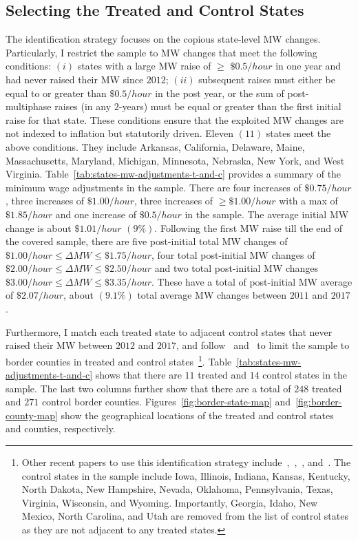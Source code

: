 \documentclass[12pt, english]{article}
\begin{document}
    \subsection{Selecting the Treated and Control States}\label{subsec:selecting-the-treated-and-control-states}
    The identification strategy focuses on the copious state-level MW changes. Particularly, I restrict the sample to MW changes that meet the following conditions: $(i)$ states with a large MW raise of $\geq$ $\$0.5/hour$ in one year and had never raised their MW since $2012$; $(ii)$ subsequent raises must either be equal to or greater than $\$0.5/hour$ in the post year, or the sum of post-multiphase raises (in any $2$-years) must be equal or greater than the first initial raise for that state. These conditions ensure that the exploited MW changes are not indexed to inflation but statutorily driven. Eleven $(11)$ states meet the above conditions. They include Arkansas, California, Delaware, Maine, Massachusetts, Maryland, Michigan, Minnesota, Nebraska, New York, and West Virginia. Table~\ref{tab:states-mw-adjustments-t-and-c} provides a summary of the minimum wage adjustments in the sample. There are four increases of $\$0.75/hour$, three increases of $\$1.00/hour$, three increases of $\geq \$1.00/hour$ with a max of $\$1.85/hour$ and one increase of $\$0.5/hour$ in the sample. The average initial MW change is about $\$1.01/hour$ $(9\%)$. Following the first MW raise till the end of the covered sample, there are five post-initial total MW changes of $\$1.00/hour \leq \Delta MW \leq \$1.75/hour$, four total post-initial MW changes of $\$2.00/hour \leq \Delta MW \leq \$2.50/hour$ and two total post-initial MW changes $\$3.00/hour \leq \Delta MW \leq \$3.35/hour$. These have a total of post-initial MW average of $\$2.07/hour$, about $(9.1\%)$ total average MW changes between $2011$ and $2017$.
    
    Furthermore, I match each treated state to adjacent control states that never raised their MW between $2012$ and $2017$, and follow~\cite{dube2010minimum} and~\cite{gopalan2021state} to limit the sample to border counties in treated and control states~\footnote{\tiny Other recent papers to use this identification strategy include~\cite{aaronson2018industry},~\cite{dube2019fairness},~\cite{jardim2018minimum}, and~\cite{zhang2019distributional}. The control states in the sample include Iowa, Illinois, Indiana, Kansas, Kentucky, North Dakota, New Hampshire, Nevada, Oklahoma, Pennsylvania, Texas, Virginia, Wisconsin, and Wyoming. Importantly, Georgia, Idaho, New Mexico, North Carolina, and Utah are removed from the list of control states as they are not adjacent to any treated states.}. Table~\ref{tab:states-mw-adjustments-t-and-c} shows that there are $11$ treated and $14$ control states in the sample. The last two columns further show that there are a total of $248$ treated and $271$ control border counties. Figures~\ref{fig:border-state-map} and~\ref{fig:border-county-map} show the geographical locations of the treated and control states and counties, respectively.
\end{document}
